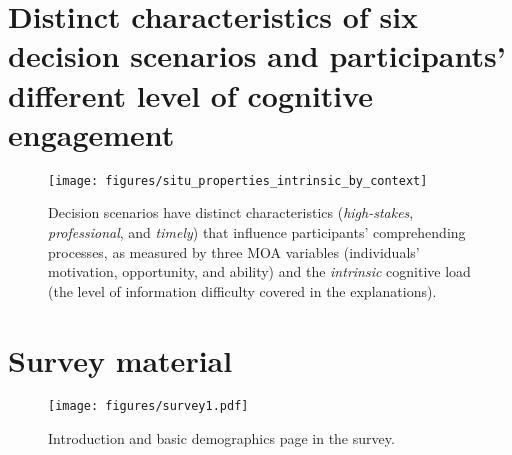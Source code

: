 \section{Distinct characteristics of six decision scenarios and participants' different level of cognitive engagement}\label{sec:contextual-prop-and-cog-engagement}
\begin{figure}[h]%
\centering
\texttt{[image: figures/situ\_properties\_intrinsic\_by\_context]}
\vspace{-2em}
\caption{Decision scenarios have distinct characteristics ({\it high-stakes}, {\it professional}, and {\it timely}) that influence participants' comprehending processes, as measured by three MOA variables (individuals' motivation, opportunity, and ability) and the {\it intrinsic} cognitive load (the level of information difficulty covered in the explanations).}\label{fig:situ}
\vspace{-1.5em}
\end{figure}


% 

\section{Survey material}\label{sec:survey}

\begin{figure}[h]%
\centering
\texttt{[image: figures/survey1.pdf]}
\caption{Introduction and basic demographics page in the survey.}\label{fig:survey1}
\end{figure}

